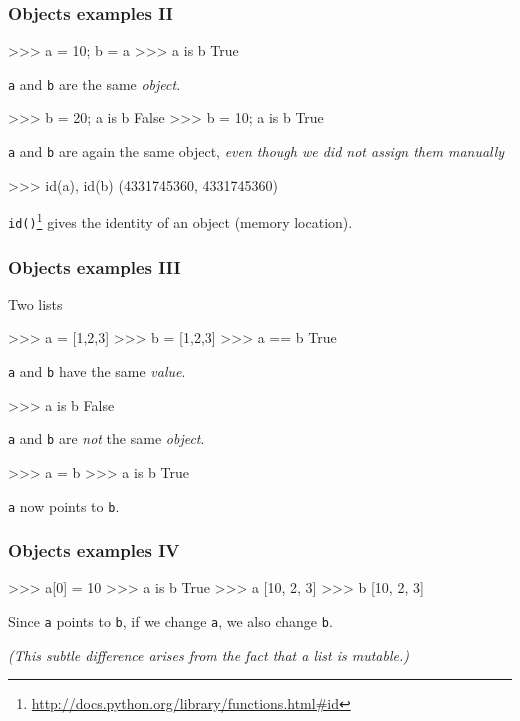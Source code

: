\documentclass[xetex,10pt]{beamer}
\def\pythoni{\lstinline[language=pythontim]}
\def\spacer{\vspace*{1em}}
\begin{document}
\begin{frame}[fragile]
	\frametitle{Objects examples II}

\begin{python}
>>> a = 10; b = a
>>> a is b
True
\end{python}

\pythoni{a} and \pythoni{b} are the same \emph{object}.
\pause

\begin{python}
>>> b = 20; a is b
False
>>> b = 10; a is b
True
\end{python}

\pythoni{a} and \pythoni{b} are again the same object, \emph{even though we did not assign them manually}
\pause

\begin{python}
>>> id(a), id(b)
(4331745360, 4331745360)
\end{python}

\pythoni{id()}\footnote[frame]{\url{http://docs.python.org/library/functions.html\#id}} gives the identity of an object (memory location).

\end{frame}

\begin{frame}[fragile]
	\frametitle{Objects examples III}

Two lists
\begin{python}
>>> a = [1,2,3]
>>> b = [1,2,3]
>>> a == b
True
\end{python}

\pythoni{a} and \pythoni{b} have the same \emph{value}.	
\pause

\begin{python}
>>> a is b
False
\end{python}

\pythoni{a} and \pythoni{b} are \emph{not} the same \emph{object}.	
\pause

\begin{python}
>>> a = b
>>> a is b
True
\end{python}

\pythoni{a} now points to \pythoni{b}.
\pause

\end{frame}


\begin{frame}[fragile]
	\frametitle{Objects examples IV}

\begin{python}
>>> a[0] = 10
>>> a is b
True
>>> a
[10, 2, 3]
>>> b
[10, 2, 3]
\end{python}

Since \pythoni{a} points to \pythoni{b}, if we change \pythoni{a}, we also change \pythoni{b}.

	\spacer

\emph{(This subtle difference arises from the fact that a list is mutable.)}

\end{frame}
\end{document}
